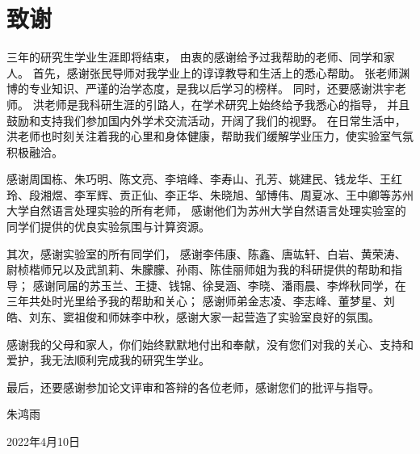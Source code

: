 \chapter{致谢}

\vspace{8pt}
三年的研究生学业生涯即将结束，
由衷的感谢给予过我帮助的老师、同学和家人。
首先，感谢张民导师对我学业上的谆谆教导和生活上的悉心帮助。
张老师渊博的专业知识、严谨的治学态度，是我以后学习的榜样。
同时，还要感谢洪宇老师。
洪老师是我科研生涯的引路人，在学术研究上始终给予我悉心的指导，
并且鼓励和支持我们参加国内外学术交流活动，开阔了我们的视野。
在日常生活中，洪老师也时刻关注着我的心里和身体健康，帮助我们缓解学业压力，使实验室气氛积极融洽。

感谢周国栋、朱巧明、陈文亮、李培峰、李寿山、孔芳、姚建民、钱龙华、王红玲、段湘煜、李军辉、贡正仙、李正华、朱晓旭、邹博伟、周夏冰、王中卿等苏州大学自然语言处理实验的所有老师，
感谢他们为苏州大学自然语言处理实验室的同学们提供的优良实验氛围与计算资源。

其次，感谢实验室的所有同学们，
感谢李伟康、陈鑫、唐竑轩、白岩、黄荣涛、尉桢楷师兄以及武凯莉、朱朦朦、孙雨、陈佳丽师姐为我的科研提供的帮助和指导；
感谢同届的苏玉兰、王捷、钱锦、徐旻涵、李晓、潘雨晨、李烨秋同学，在三年共处时光里给予我的帮助和关心；
感谢师弟金志凌、李志峰、董梦星、刘皓、刘东、窦祖俊和师妹李中秋，感谢大家一起营造了实验室良好的氛围。

感谢我的父母和家人，你们始终默默地付出和奉献，没有您们对我的关心、支持和爱护，我无法顺利完成我的研究生学业。

最后，还要感谢参加论文评审和答辩的各位老师，感谢您们的批评与指导。

\vspace{10pt}
\begin{flushright}
    朱鸿雨

    2022年4月10日
\end{flushright}

